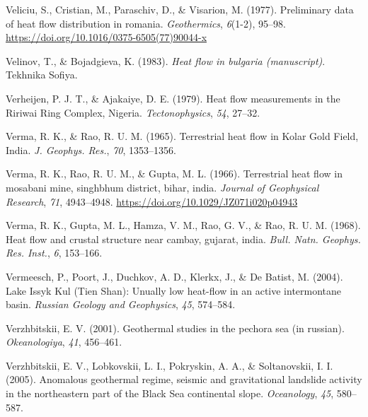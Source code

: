 \documentclass[draft,linenumbers]{agujournal2018}
\begin{document}
\leavevmode{}%
Veliciu, S., Cristian, M., Paraschiv, D., \& Visarion, M. (1977).
Preliminary data of heat flow distribution in romania.
\emph{Geothermics}, \emph{6}(1-2), 95--98.
\url{https://doi.org/10.1016/0375-6505(77)90044-x}

\leavevmode{}%
Velinov, T., \& Bojadgieva, K. (1983). \emph{Heat flow in bulgaria
(manuscript)}. Tekhnika Sofiya.

\leavevmode{}%
Verheijen, P. J. T., \& Ajakaiye, D. E. (1979). Heat flow measurements
in the {Ririwai Ring Complex, Nigeria}. \emph{Tectonophysics},
\emph{54}, 27--32.

\leavevmode{}%
Verma, R. K., \& Rao, R. U. M. (1965). Terrestrial heat flow in {Kolar
Gold Field}, {India}. \emph{J. Geophys. Res.}, \emph{70}, 1353--1356.

\leavevmode{}%
Verma, R. K., Rao, R. U. M., \& Gupta, M. L. (1966). Terrestrial heat
flow in mosabani mine, singhbhum district, bihar, india. \emph{Journal
of Geophysical Research}, \emph{71}, 4943--4948.
\url{https://doi.org/10.1029/JZ071i020p04943}

\leavevmode{}%
Verma, R. K., Gupta, M. L., Hamza, V. M., Rao, G. V., \& Rao, R. U. M.
(1968). Heat flow and crustal structure near cambay, gujarat, india.
\emph{Bull. Natn. Geophys. Res. Inst.}, \emph{6}, 153--166.

\leavevmode{}%
Vermeesch, P., Poort, J., Duchkov, A. D., Klerkx, J., \& De Batist, M.
(2004). {Lake Issyk Kul (Tien Shan)}: Unually low heat-flow in an active
intermontane basin. \emph{Russian Geology and Geophysics}, \emph{45},
574--584.

\leavevmode{}%
Verzhbitskii, E. V. (2001). Geothermal studies in the pechora sea (in
russian). \emph{Okeanologiya}, \emph{41}, 456--461.

\leavevmode{}%
Verzhbitskii, E. V., Lobkovskii, L. I., Pokryskin, A. A., \&
Soltanovskii, I. I. (2005). Anomalous geothermal regime, seismic and
gravitational landslide activity in the northeastern part of the {Black
Sea} continental slope. \emph{Oceanology}, \emph{45}, 580--587.
\end{document}
